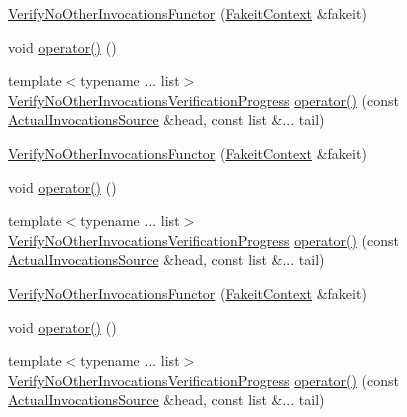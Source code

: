 \begin{DoxyCompactItemize}
\item 
\mbox{\hyperlink{classfakeit_1_1VerifyNoOtherInvocationsFunctor_ac17e4b84ac34bbdfe2f47a6d9e64e310}{Verify\+No\+Other\+Invocations\+Functor}} (\mbox{\hyperlink{structfakeit_1_1FakeitContext}{Fakeit\+Context}} \&fakeit)
\item 
void \mbox{\hyperlink{classfakeit_1_1VerifyNoOtherInvocationsFunctor_a40fae42fc436deb576fd08482382811a}{operator()}} ()
\item 
{\footnotesize template$<$typename ... list$>$ }\\\mbox{\hyperlink{classfakeit_1_1VerifyNoOtherInvocationsVerificationProgress}{Verify\+No\+Other\+Invocations\+Verification\+Progress}} \mbox{\hyperlink{classfakeit_1_1VerifyNoOtherInvocationsFunctor_a6f43e7d3b976534fa8f22abfad04004a}{operator()}} (const \mbox{\hyperlink{structfakeit_1_1ActualInvocationsSource}{Actual\+Invocations\+Source}} \&head, const list \&... tail)
\item 
\mbox{\hyperlink{classfakeit_1_1VerifyNoOtherInvocationsFunctor_ac17e4b84ac34bbdfe2f47a6d9e64e310}{Verify\+No\+Other\+Invocations\+Functor}} (\mbox{\hyperlink{structfakeit_1_1FakeitContext}{Fakeit\+Context}} \&fakeit)
\item 
void \mbox{\hyperlink{classfakeit_1_1VerifyNoOtherInvocationsFunctor_a40fae42fc436deb576fd08482382811a}{operator()}} ()
\item 
{\footnotesize template$<$typename ... list$>$ }\\\mbox{\hyperlink{classfakeit_1_1VerifyNoOtherInvocationsVerificationProgress}{Verify\+No\+Other\+Invocations\+Verification\+Progress}} \mbox{\hyperlink{classfakeit_1_1VerifyNoOtherInvocationsFunctor_a6f43e7d3b976534fa8f22abfad04004a}{operator()}} (const \mbox{\hyperlink{structfakeit_1_1ActualInvocationsSource}{Actual\+Invocations\+Source}} \&head, const list \&... tail)
\item 
\mbox{\hyperlink{classfakeit_1_1VerifyNoOtherInvocationsFunctor_ac17e4b84ac34bbdfe2f47a6d9e64e310}{Verify\+No\+Other\+Invocations\+Functor}} (\mbox{\hyperlink{structfakeit_1_1FakeitContext}{Fakeit\+Context}} \&fakeit)
\item 
void \mbox{\hyperlink{classfakeit_1_1VerifyNoOtherInvocationsFunctor_a40fae42fc436deb576fd08482382811a}{operator()}} ()
\item 
{\footnotesize template$<$typename ... list$>$ }\\\mbox{\hyperlink{classfakeit_1_1VerifyNoOtherInvocationsVerificationProgress}{Verify\+No\+Other\+Invocations\+Verification\+Progress}} \mbox{\hyperlink{classfakeit_1_1VerifyNoOtherInvocationsFunctor_a6f43e7d3b976534fa8f22abfad04004a}{operator()}} (const \mbox{\hyperlink{structfakeit_1_1ActualInvocationsSource}{Actual\+Invocations\+Source}} \&head, const list \&... tail)

\end{DoxyCompactItemize}
